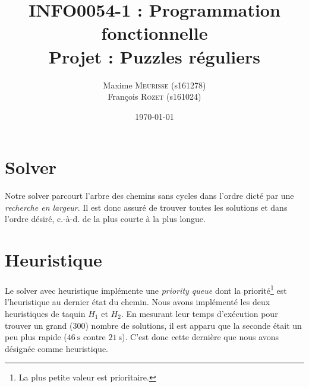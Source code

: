 \documentclass[a4paper, 11pt]{article}
\title{\textbf{\textsc{INFO0054-1} : Programmation fonctionnelle}\\Projet : Puzzles réguliers}
\author{Maxime \textsc{Meurisse} (s161278)\\François \textsc{Rozet} (s161024)\\}
\date{\today}
\begin{document}
    \maketitle
    \section{Solver}
    Notre solver parcourt l'arbre des chemins sans cycles dans l'ordre dicté par une \emph{recherche en largeur}. Il est donc assuré de trouver toutes les solutions et dans l'ordre désiré, c.-à-d. de la plus courte à la plus longue.
    \setcounter{section}{2}
    \section{Heuristique}
    Le solver \og{}avec heuristique\fg{} implémente une \emph{priority queue} dont la priorité\footnote{La plus petite valeur est prioritaire.} est l'heuristique au dernier état du chemin.
    Nous avons implémenté les deux heuristiques de taquin $H_1$ et $H_2$. En mesurant leur temps d'exécution pour trouver un grand ($\num{300}$) nombre de solutions, il est apparu que la seconde était un peu plus rapide ($\SI{46}{\second}$ contre $\SI{21}{\second}$). C'est donc cette dernière que nous avons désignée comme heuristique.
\end{document}

